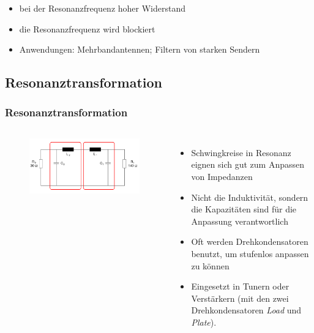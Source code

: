 \begin{frame}
\begin{columns}
\begin{center}
\begin{figure}
      \end{figure}
    \end{center}
  \end{columns}
  \pause
  \begin{itemize}
    \item bei der Resonanzfrequenz hoher Widerstand
    \item die Resonanzfrequenz wird blockiert
    \item Anwendungen: Mehrbandantennen; Filtern von starken Sendern
  \end{itemize}
\end{frame}

\subsection*{Resonanz\-trans\-formation}
\begin{frame}
  \frametitle{Resonanztransformation}
  \begin{columns}
    \begin{center}
      \begin{figure}
        \includegraphics[width=\textwidth,height=.75\textheight,keepaspectratio]{a04/Pi-Filter.png}\\
      \end{figure}
    \end{center}
    \begin{itemize}
      \item Schwingkreise in Resonanz eignen sich gut zum Anpassen von Impedanzen
      \item Nicht die Induktivität, sondern die Kapazitäten sind für die Anpassung verantwortlich
      \item Oft werden Drehkondensatoren benutzt, um stufenlos anpassen zu können
      \item Eingesetzt in Tunern oder Verstärkern (mit den zwei Drehkondensatoren \emph{Load} und \emph{Plate}).
    \end{itemize}
  \end{columns}
\end{frame}

